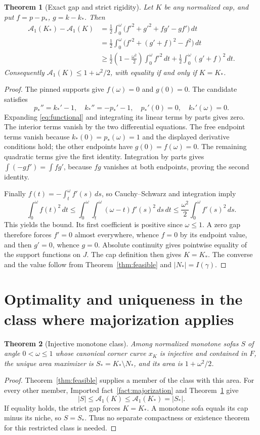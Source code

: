 \documentclass[11pt]{article}
\newtheorem{theorem}{Theorem}[section]
\theoremstyle{remark}\newtheorem{remark}[theorem]{Remark}
\newcommand{\area}[1]{\lvert #1\rvert}
\newcommand{\Aone}{\mathcal A_1}
\begin{document}
\begin{theorem}[Exact gap and strict rigidity]\label{thm:gap}
Let $K$ be any normalized cap, and put $f=p-p_*$, $g=k-k_*$. Then
\begin{align*}
 \Aone(K_*)-\Aone(K)
 &=\frac12\int_0^\omega\bigl(f'^2+g'^2+f g'-g f'\bigr)\,dt\\
 &=\frac12\int_0^\omega\bigl(f'^2+(g'+f)^2-f^2\bigr)\,dt\\
 &\ge\frac12\left(1-\frac{\omega^2}{2}\right)\int_0^\omega f'^2\,dt
       +\frac12\int_0^\omega(g'+f)^2\,dt.
\end{align*}
Consequently $\Aone(K)\le1+\omega^2/2$, with equality if and only if $K=K_*$.
\end{theorem}
\begin{proof}
The pinned supports give $f(\omega)=0$ and $g(0)=0$. The candidate satisfies
\[
 p_*''=k_*'-1,\quad k_*''=-p_*'-1,\quad p_*'(0)=0,\quad k_*'(\omega)=0.
\]
Expanding \eqref{eq:functional} and integrating its linear terms by parts gives zero. The interior terms vanish by the two differential equations. The free endpoint terms vanish because $k_*(0)=p_*(\omega)=1$ and the displayed derivative conditions hold; the other endpoints have $g(0)=f(\omega)=0$. The remaining quadratic terms give the first identity. Integration by parts gives $\int(-g f')=\int f g'$, because $fg$ vanishes at both endpoints, proving the second identity.

Finally $f(t)=-\int_t^\omega f'(s)\,ds$, so Cauchy--Schwarz and integration imply
\[
 \int_0^\omega f(t)^2\,dt
 \le\int_0^\omega\int_t^\omega(\omega-t)f'(s)^2\,ds\,dt
 \le\frac{\omega^2}{2}\int_0^\omega f'(s)^2\,ds.
\]
This yields the bound. Its first coefficient is positive since $\omega\le1$. A zero gap therefore forces $f'=0$ almost everywhere, whence $f=0$ by its endpoint value, and then $g'=0$, whence $g=0$. Absolute continuity gives pointwise equality of the support functions on $J$. The cap definition then gives $K=K_*$. The converse and the value follow from Theorem~\ref{thm:feasible} and $\area{N_*}=I(\gamma)$.
\end{proof}

\section{Optimality and uniqueness in the class where majorization applies}
\begin{theorem}[Injective monotone class]\label{thm:conditional}
Among normalized monotone sofas $S$ of angle $0<\omega\le1$ whose canonical corner curve $x_K$ is injective and contained in $F$, the unique area maximizer is $S_*=K_*\setminus N_*$, and its area is $1+\omega^2/2$.
\end{theorem}
\begin{proof}
Theorem~\ref{thm:feasible} supplies a member of the class with this area. For every other member, Imported fact~\ref{fact:majorization} and Theorem~\ref{thm:gap} give
\[
 \area S\le\Aone(K)\le\Aone(K_*)=\area{S_*}.
\]
If equality holds, the strict gap forces $K=K_*$. A monotone sofa equals its cap minus its niche, so $S=S_*$. Thus no separate compactness or existence theorem for this restricted class is needed.
\end{proof}
\end{document}

